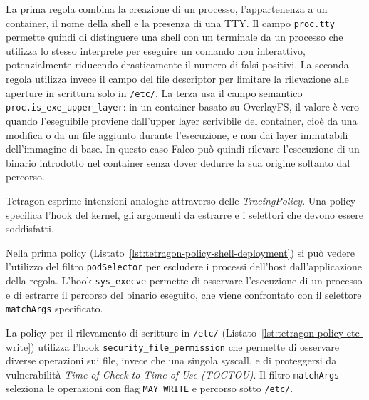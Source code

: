 \documentclass[12pt,a4paper,openright,twoside]{book}
\begin{document}
La prima regola combina la creazione di un processo, l'appartenenza a un container, il nome della shell e la presenza di una TTY. Il campo \texttt{proc.tty} permette quindi di distinguere una shell con un terminale da un processo che utilizza lo stesso interprete per eseguire un comando non interattivo, potenzialmente riducendo drasticamente il numero di falsi positivi. La seconda regola utilizza invece il campo del file descriptor per limitare la rilevazione alle aperture in scrittura solo in \texttt{/etc/}. La terza usa il campo semantico \texttt{proc.is\_exe\_upper\_layer}: in un container basato su OverlayFS, il valore è vero quando l'eseguibile proviene dall'upper layer scrivibile del container, cioè da una modifica o da un file aggiunto durante l'esecuzione, e non dai layer immutabili dell'immagine di base. In questo caso Falco può quindi rilevare l'esecuzione di un binario introdotto nel container senza dover dedurre la sua origine soltanto dal percorso.

Tetragon esprime intenzioni analoghe attraverso delle \textit{TracingPolicy}. Una policy specifica l'hook del kernel, gli argomenti da estrarre e i selettori che devono essere soddisfatti.







Nella prima policy (Listato~\ref{lst:tetragon-policy-shell-deployment}) si può vedere l'utilizzo del filtro \texttt{podSelector} per escludere i processi dell'host dall'applicazione della regola. L'hook \texttt{sys\_execve} permette di osservare l'esecuzione di un processo e di estrarre il percorso del binario eseguito, che viene confrontato con il selettore \texttt{matchArgs} specificato.

La policy per il rilevamento di scritture in \texttt{/etc/} (Listato~\ref{lst:tetragon-policy-etc-write}) utilizza l'hook \texttt{security\_file\_permission} che permette di osservare diverse operazioni sui file, invece che una singola syscall, e di proteggersi da vulnerabilità \textit{Time-of-Check to Time-of-Use (TOCTOU)}. Il filtro \texttt{matchArgs} seleziona le operazioni con flag \texttt{MAY\_WRITE} e percorso sotto \texttt{/etc/}.
\end{document}
